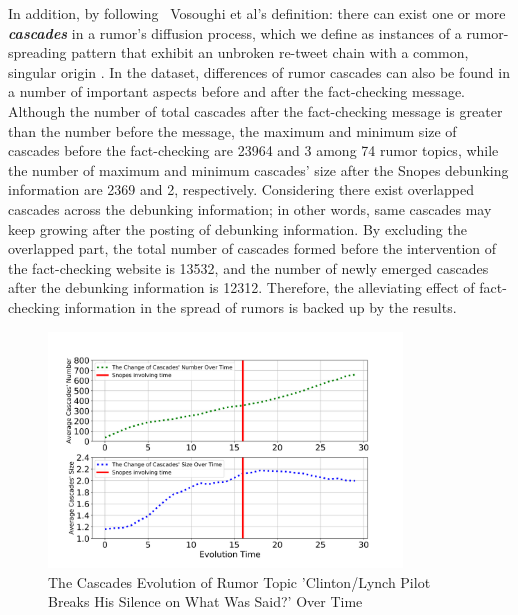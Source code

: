 \documentclass[conference]{IEEEtran}
\begin{document}
	In addition, by following  Vosoughi et al's definition: there can exist one or more \textbf{\emph{cascades}} in a rumor's diffusion process, which we define as instances of a rumor-spreading pattern that exhibit an unbroken re-tweet chain with a common, singular origin \cite{vosoughi2018spread}. In the dataset, differences of rumor cascades can also be found in a number of important aspects before and after the fact-checking message. Although the number of total cascades after the fact-checking message is greater than the number before the message, the maximum and minimum size of cascades before the fact-checking are 23964 and 3 among 74 rumor topics, while the number of maximum and minimum cascades' size after the Snopes debunking information are 2369 and 2, respectively. Considering there exist overlapped cascades across the debunking information; in other words, same cascades may keep growing after the posting of debunking information. By excluding the overlapped part, the total number of cascades formed before the intervention of the fact-checking website is 13532, and the number of newly emerged cascades after the debunking information is 12312. Therefore, the alleviating effect of fact-checking information in the spread of rumors is backed up by the results. 
	
	\begin{figure}[htbp]
		\centerline{\includegraphics[width=3.7in]{figures/figure_5.png}}
		\caption{The Cascades Evolution of Rumor Topic 'Clinton/Lynch Pilot Breaks His Silence on What Was Said?' Over Time}
		\label{fig:evolution}
	\end{figure}
	
\end{document}
